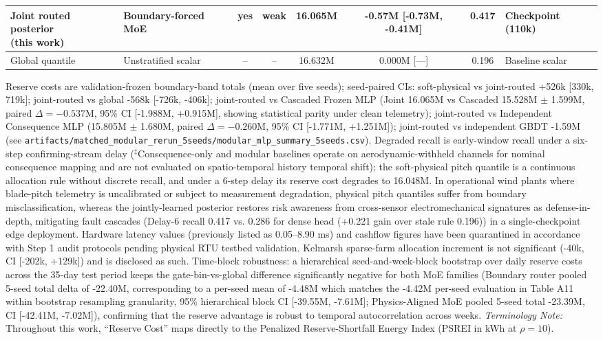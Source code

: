 \documentclass[
  journal]{IEEEtran}
\begin{document}
\begin{table}[!t]
\begin{tabular*}{\textwidth}{@{\extracolsep{\fill}}llcccccl@{}}
\shortstack[l]{Joint routed posterior\\(this work)} & Boundary-forced MoE & yes & weak & 16.065M & -0.57M [-0.73M, -0.41M] & 0.417 & Checkpoint (110k) \\
\midrule
Global quantile & Unstratified scalar & -- & -- & 16.632M & 0.000M [---] & 0.196 & Baseline scalar \\
\bottomrule
\end{tabular*}
\vspace{1mm}
\parbox{\linewidth}{\fontsize{8.0pt}{9.0pt}\selectfont\raggedright Reserve costs are validation-frozen boundary-band totals (mean over five seeds); seed-paired CIs: soft-physical vs joint-routed +526k [330k, 719k]; joint-routed vs global -568k [-726k, -406k]; joint-routed vs Cascaded Frozen MLP (Joint 16.065M vs Cascaded 15.528M $\pm$ 1.599M, paired $\Delta = -0.537\text{M}$, 95\% CI [-1.988M, +0.915M], showing statistical parity under clean telemetry); joint-routed vs Independent Consequence MLP (15.805M $\pm$ 1.680M, paired $\Delta = -0.260\text{M}$, 95\% CI [-1.771M, +1.251M]); joint-routed vs independent GBDT -1.59M (see \texttt{artifacts/}\allowbreak\texttt{matched\_modular\_rerun\_5seeds/}\allowbreak\texttt{modular\_mlp\_summary\_5seeds.csv}). Degraded recall is early-window recall under a six-step confirming-stream delay ($^{\ddagger}$Consequence-only and modular baselines operate on aerodynamic-withheld channels for nominal consequence mapping and are not evaluated on spatio-temporal history temporal shift); the soft-physical pitch quantile is a continuous allocation rule without discrete recall, and under a 6-step delay its reserve cost degrades to 16.048M. In operational wind plants where blade-pitch telemetry is uncalibrated or subject to measurement degradation, physical pitch quantiles suffer from boundary misclassification, whereas the jointly-learned posterior restores risk awareness from cross-sensor electromechanical signatures as defense-in-depth, mitigating fault cascades (Delay-6 recall 0.417 vs. 0.286 for dense head (+0.221 gain over stale rule 0.196)) in a single-checkpoint edge deployment. Hardware latency values (previously listed as 0.05--8.90 ms) and cashflow figures have been quarantined in accordance with Step 1 audit protocols pending physical RTU testbed validation. Kelmarsh sparse-farm allocation increment is not significant (-40k, CI [-202k, +129k]) and is disclosed as such. Time-block robustness: a hierarchical seed-and-week-block bootstrap over daily reserve costs across the 35-day test period keeps the gate-bin-vs-global difference significantly negative for both MoE families (Boundary router pooled 5-seed total delta of -22.40M, corresponding to a per-seed mean of -4.48M which matches the -4.42M per-seed evaluation in Table A11 within bootstrap resampling granularity, 95\% hierarchical block CI [-39.55M, -7.61M]; Physics-Aligned MoE pooled 5-seed total -23.39M, CI [-42.41M, -7.02M]), confirming that the reserve advantage is robust to temporal autocorrelation across weeks. \textit{Terminology Note:} Throughout this work, ``Reserve Cost'' maps directly to the Penalized Reserve-Shortfall Energy Index (PSREI in kWh at $\rho=10$).}
\end{table}
\end{document}
